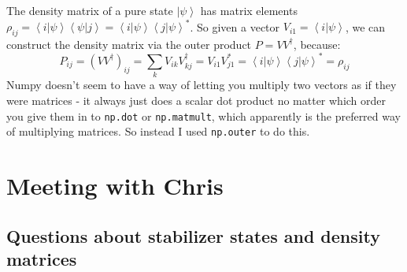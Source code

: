 \documentclass{report}
\begin{document}
 The density matrix of a pure state $\left|\psi\right>$ has matrix elements $\rho_{ij}=\left<i|\psi\right>\left<\psi|j\right>=\left<i|\psi\right>\left<j|\psi\right>^*$. So given a vector $V_{i1}=\left<i|\psi\right>$, we can construct the density matrix via the outer product $P=VV^\dagger$, because:
 \begin{equation}P_{ij}=\left(VV^\dagger\right)_{ij}=\sum_k V_{ik}V^\dagger_{kj}=V_{i1}V_{j1}^*=\left<i|\psi\right>\left<j|\psi\right>^*=\rho_{ij}\end{equation}
 Numpy doesn't seem to have a way of letting you multiply two vectors as if they were matrices - it always just does a scalar dot product no matter which order you give them in to \lstinline{np.dot} or \lstinline{np.matmult}, which apparently is the preferred way of multiplying matrices. So instead I used \lstinline{np.outer} to do this. 
 
 \section{Meeting with Chris}
 
 \subsection{Questions about stabilizer states and density matrices}
 
\end{document}
